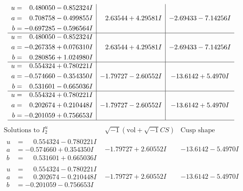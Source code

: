 \documentclass[1p]{elsarticle_modified}
\theoremstyle{definition}
\newcommand{\I}{\sqrt{-1}}
\begin{document}
$$\begin{array}{c|c|c}
\begin{aligned}
u &= \phantom{-}0.480050 - 0.852324 I \\
a &= \phantom{-}0.708758 - 0.499855 I \\
b &= -0.697285 - 0.596564 I\end{aligned}
 & \phantom{-}2.63544 + 4.29581 I & -2.69433 - 7.14256 I \\ \hline\begin{aligned}
u &= \phantom{-}0.480050 - 0.852324 I \\
a &= -0.267358 + 0.076310 I \\
b &= \phantom{-}0.280856 + 1.024980 I\end{aligned}
 & \phantom{-}2.63544 + 4.29581 I & -2.69433 - 7.14256 I \\ \hline\begin{aligned}
u &= \phantom{-}0.554324 + 0.780221 I \\
a &= -0.574660 - 0.354350 I \\
b &= \phantom{-}0.531601 - 0.665036 I\end{aligned}
 & -1.79727 - 2.60552 I & -13.6142 + 5.4970 I \\ \hline\begin{aligned}
u &= \phantom{-}0.554324 + 0.780221 I \\
a &= \phantom{-}0.202674 + 0.210448 I \\
b &= -0.201059 + 0.756653 I\end{aligned}
 & -1.79727 - 2.60552 I & -13.6142 + 5.4970 I\\
 \hline 
 \end{array}$$\newpage$$\begin{array}{c|c|c}  
\text{Solutions to }I^u_{2}& \I (\text{vol} + \sqrt{-1}CS) & \text{Cusp shape}\\
 \hline 
\begin{aligned}
u &= \phantom{-}0.554324 - 0.780221 I \\
a &= -0.574660 + 0.354350 I \\
b &= \phantom{-}0.531601 + 0.665036 I\end{aligned}
 & -1.79727 + 2.60552 I & -13.6142 - 5.4970 I \\ \hline\begin{aligned}
u &= \phantom{-}0.554324 - 0.780221 I \\
a &= \phantom{-}0.202674 - 0.210448 I \\
b &= -0.201059 - 0.756653 I\end{aligned}
 & -1.79727 + 2.60552 I & -13.6142 - 5.4970 I \\ \hline\begin{aligned}

\end{aligned}
\end{array}$$
\end{document}
